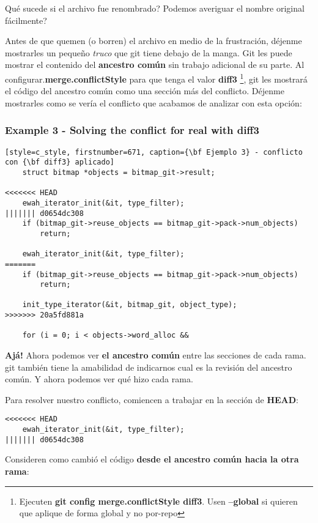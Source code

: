 Qué sucede si el archivo fue renombrado? Podemos averiguar el nombre original fácilmente?

Antes de que quemen (o borren) el archivo en medio de la frustración, déjenme mostrarles un pequeño {\it truco} que git tiene debajo de la
manga. Git les puede mostrar el contenido del {\bf ancestro común} sin trabajo adicional de su parte. Al configurar.{\bf merge.conflictStyle}
para que tenga el valor {\bf diff3} \footnote{ Ejecuten {\bf git config merge.conflictStyle diff3}. Usen {\bf --global} si
quieren que aplique de forma global y no por-repo}, git les mostrará el código del ancestro común como una sección
más del conflicto. Déjenme mostrarles como se vería el conflicto que acabamos de analizar con esta opción:

\subsubsection{Example 3 - Solving the conflict for real with {\bf diff3}}
\begin{lstlisting}[style=c_style, firstnumber=671, caption={\bf Ejemplo 3} - conflicto con {\bf diff3} aplicado]
	struct bitmap *objects = bitmap_git->result;

<<<<<<< HEAD
	ewah_iterator_init(&it, type_filter);
||||||| d0654dc308
	if (bitmap_git->reuse_objects == bitmap_git->pack->num_objects)
		return;

	ewah_iterator_init(&it, type_filter);
=======
	if (bitmap_git->reuse_objects == bitmap_git->pack->num_objects)
		return;

	init_type_iterator(&it, bitmap_git, object_type);
>>>>>>> 20a5fd881a

	for (i = 0; i < objects->word_alloc &&
\end{lstlisting}

{\bf Ajá!} Ahora podemos ver {\bf el ancestro común} entre las secciones de cada rama. git también tiene la amabilidad de
indicarnos cual es la revisión del ancestro común. Y ahora podemos ver qué hizo cada rama.

Para resolver nuestro conflicto, comiencen a trabajar en la sección de {\bf HEAD}:
\begin{lstlisting}[style=c_style, firstnumber=673, caption={\bf Ejemplo 3} - paso 1]
<<<<<<< HEAD
	ewah_iterator_init(&it, type_filter);
||||||| d0654dc308
\end{lstlisting}

Consideren como cambió el código {\bf desde el ancestro común hacia la otra rama}:

